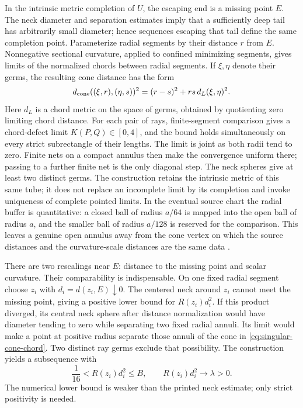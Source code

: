 In the intrinsic metric completion of $U$, the escaping end is a missing
point $E$. The neck diameter and separation estimates imply that a
sufficiently deep tail has arbitrarily small diameter; hence sequences
escaping that tail define the same completion point. Parameterize radial
segments by their distance $r$ from $E$. Nonnegative sectional curvature,
applied to confined minimizing segments, gives limits of the normalized
chords between radial segments. If $\xi,\eta$ denote their germs, the
resulting cone distance has the form
\begin{equation}
 d_{\rm cone}((\xi,r),(\eta,s))^2
       =(r-s)^2+rs\,d_L(\xi,\eta)^2.
 \label{eq:singular-cone-chord}
\end{equation}
Here $d_L$ is a chord metric on the space of germs, obtained by quotienting
zero limiting chord distance. For each pair of rays, finite-segment
comparison gives a chord-defect limit $K(P,Q)\in[0,4]$, and the bound holds
simultaneously on every strict subrectangle of their lengths. The limit is
joint as both radii tend to zero. Finite nets on a compact annulus then make
the convergence uniform there; passing to a further finite net is the only
diagonal step. The neck spheres give at least two distinct germs. The
construction retains the intrinsic metric of this same tube; it does not
replace an incomplete limit by its completion and invoke uniqueness of
complete pointed limits. In the eventual source chart the radial buffer is
quantitative: a closed ball of radius $a/64$ is mapped into the open ball of
radius $a$, and the smaller ball of radius $a/128$ is reserved for the
comparison. This leaves a genuine open annulus away from the cone vertex on
which the source distances and the curvature-scale distances are the same
data
\cite[Sections 10.3--10.4, pp. 253--263]{MT2007}.

There are two rescalings near $E$: distance to the missing point and scalar
curvature. Their comparability is indispensable. On one fixed radial
segment choose $z_i$ with $d_i=d(z_i,E)\downarrow0$. The centered neck
around $z_i$ cannot meet the missing point, giving a positive lower bound
for $R(z_i)d_i^2$. If this product diverged, its central neck sphere after
distance normalization would have diameter tending to zero while separating
two fixed radial annuli. Its limit would make a point at positive radius
separate those annuli of the cone in \eqref{eq:singular-cone-chord}.
Two distinct ray germs exclude that possibility. The construction yields
a subsequence with
\begin{equation}
 \frac1{16}<R(z_i)d_i^2\leq B,
 \qquad R(z_i)d_i^2\longrightarrow\lambda>0.
 \label{eq:singular-scalar-radius}
\end{equation}
The numerical lower bound is weaker than the printed neck estimate; only
strict positivity is needed.

